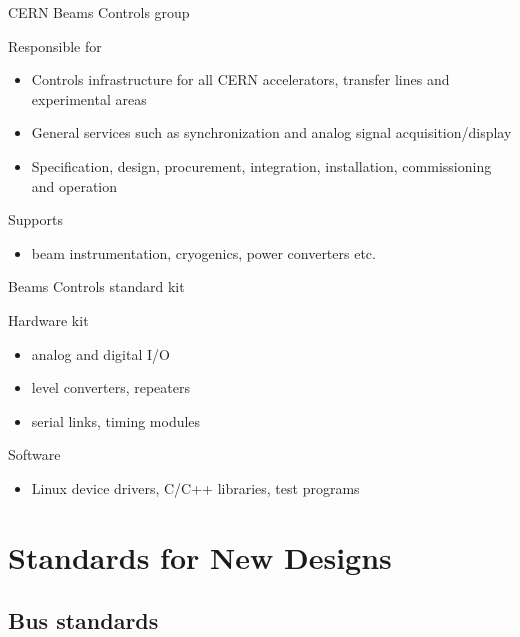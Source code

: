 \documentclass[compress,red]{beamer}
\begin{document}
\begin{frame}{CERN Beams Controls group}
\begin{block}{Responsible for}
  \begin{itemize}
  \item 
    Controls infrastructure for all CERN accelerators, transfer lines and experimental areas
  \item 
   General services such as synchronization and analog signal acquisition/display
  \item 
    Specification, design, procurement, integration, installation, commissioning and operation
  \end{itemize}
\end{block}

\begin{block}{Supports}
  \begin{itemize}
  \item beam instrumentation, cryogenics, power converters etc.
  \end{itemize}
\end{block}

\end{frame}


\begin{frame}{Beams Controls standard kit}

\begin{block}{Hardware kit}
  \begin{itemize}
      \item  analog and digital I/O
      \item level converters, repeaters
      \item serial links, timing modules
    \end{itemize}
\end{block}


\begin{block}{Software}
  \begin{itemize}
  \item Linux device drivers, C/C++ libraries, test programs
  \end{itemize}
\end{block}

\end{frame}

\section{Standards for New Designs}

\subsection{Bus standards}
\end{document}
